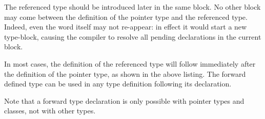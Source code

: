 The referenced type should be introduced later in the same  block.
No other block may come between the definition of the pointer type and the referenced type.
Indeed, even the word  itself may not re-appear: in effect it
would start a new type-block, causing the compiler to resolve all pending
declarations in the current block.

In most cases, the definition of the referenced type will follow immediately
after the definition of the pointer type, as shown in the above listing.
The forward defined type can be used in any type definition following its
declaration.

Note that a forward type declaration is only possible with pointer types and
classes, not with other types.


